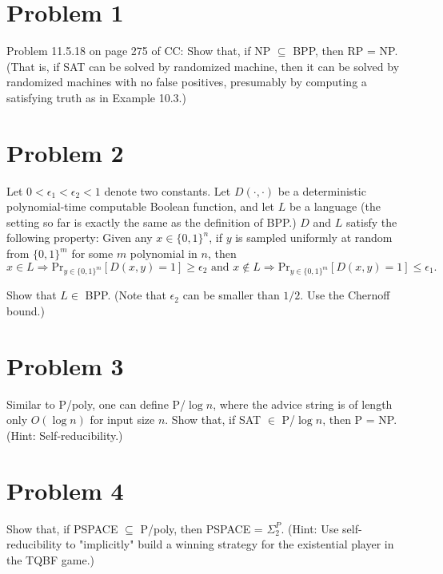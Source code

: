 \documentclass[twoside,11pt]{homework}
\date{\today} %
\begin{document}
\maketitle

\section*{Problem 1}

\begin{prob}
  Problem 11.5.18 on page 275 of CC:
  Show that, if NP $\subseteq$ BPP, then RP = NP.
  (That is, if SAT can be solved by randomized machine, then it can be solved by
  randomized machines with no false positives, presumably by computing a
  satisfying truth as in Example 10.3.)
\end{prob}

\section*{Problem 2}
\begin{prob}
  Let $0 < \epsilon_1 < \epsilon_2 < 1$ denote two constants. Let $D(\cdot, \cdot)$ be a deterministic
  polynomial-time computable Boolean function, and let $L$ be a language (the
  setting so far is exactly the same as the definition of BPP.)
  $D$ and $L$ satisfy the following property:
  Given any $x \in \{0, 1\}^n$, if $y$ is sampled uniformly at random from $\{ 0,1
  \}^m$ for some $m$ polynomial in $n$, then
  \[
    x \in L \Rightarrow \text{Pr}_{y \in \{0,1\}^m}[D(x,y) = 1] \ge \epsilon_2
    \text{ and }
    x \notin L \Rightarrow \text{Pr}_{y \in \{0,1\}^m}[D(x,y) = 1] \le \epsilon_1.
  \]

  Show that $L \in$ BPP.
  (Note that $\epsilon_2$ can be smaller than $1/2$.
   Use the Chernoff bound.)
\end{prob}

\section*{Problem 3}

\begin{prob}
  Similar to P/poly, one can define P/$\log n$, where the advice string is of
  length only $O(\log n)$ for input size $n$.
  Show that, if SAT $\in$ P/$\log n$, then P = NP.
  (Hint: Self-reducibility.)
\end{prob}

\section*{Problem 4}

\begin{prob}
  Show that, if PSPACE $\subseteq$ P/poly, then PSPACE = $\Sigma_2^P$.
  (Hint: Use self-reducibility to "implicitly" build a winning strategy for the
  existential player in the TQBF game.)
\end{prob}
\end{document}
